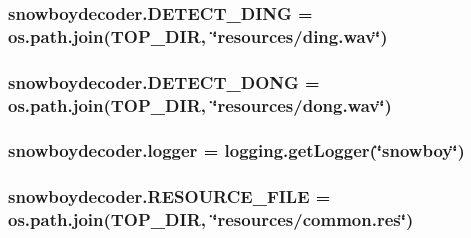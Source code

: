 \subsubsection[{\texorpdfstring{D\+E\+T\+E\+C\+T\+\_\+\+D\+I\+NG}{DETECT_DING}}]{\setlength{\rightskip}{0pt plus 5cm}snowboydecoder.\+D\+E\+T\+E\+C\+T\+\_\+\+D\+I\+NG = os.\+path.\+join({\bf T\+O\+P\+\_\+\+D\+IR}, \char`\"{}resources/ding.\+wav\char`\"{})}\hypertarget{namespacesnowboydecoder_ae78f17cd44cb19906efdf4e4b57f1553}{}\label{namespacesnowboydecoder_ae78f17cd44cb19906efdf4e4b57f1553}
\subsubsection[{\texorpdfstring{D\+E\+T\+E\+C\+T\+\_\+\+D\+O\+NG}{DETECT_DONG}}]{\setlength{\rightskip}{0pt plus 5cm}snowboydecoder.\+D\+E\+T\+E\+C\+T\+\_\+\+D\+O\+NG = os.\+path.\+join({\bf T\+O\+P\+\_\+\+D\+IR}, \char`\"{}resources/dong.\+wav\char`\"{})}\hypertarget{namespacesnowboydecoder_a4c632caea64a9aaa6e1433c4253f7753}{}\label{namespacesnowboydecoder_a4c632caea64a9aaa6e1433c4253f7753}
\subsubsection[{\texorpdfstring{logger}{logger}}]{\setlength{\rightskip}{0pt plus 5cm}snowboydecoder.\+logger = logging.\+get\+Logger(\char`\"{}snowboy\char`\"{})}\hypertarget{namespacesnowboydecoder_a0a9e17da91fa38e4980d70341f1af701}{}\label{namespacesnowboydecoder_a0a9e17da91fa38e4980d70341f1af701}
\subsubsection[{\texorpdfstring{R\+E\+S\+O\+U\+R\+C\+E\+\_\+\+F\+I\+LE}{RESOURCE_FILE}}]{\setlength{\rightskip}{0pt plus 5cm}snowboydecoder.\+R\+E\+S\+O\+U\+R\+C\+E\+\_\+\+F\+I\+LE = os.\+path.\+join({\bf T\+O\+P\+\_\+\+D\+IR}, \char`\"{}resources/common.\+res\char`\"{})}\hypertarget{namespacesnowboydecoder_ae9aa648d909800942df02cc34b56b83a}{}\label{namespacesnowboydecoder_ae9aa648d909800942df02cc34b56b83a}
